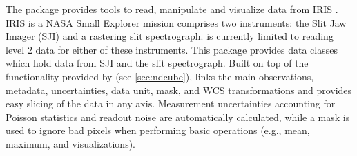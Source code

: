 The  package provides tools to read, manipulate and visualize data from IRIS \citep{DePontieu2014}.
IRIS is a NASA Small Explorer mission comprises two instruments: the Slit Jaw Imager (SJI) and a rastering slit spectrograph.
 is currently limited to reading level 2 data for either of these instruments.
This package provides data classes which hold data from SJI and the slit spectrograph.
Built on top of the functionality provided by  (see \autoref{sec:ndcube}),  links the main observations, metadata, uncertainties, data unit, mask, and WCS transformations and provides easy slicing of the data in any axis.
Measurement uncertainties accounting for Poisson statistics and readout noise are automatically calculated, while a mask is used to ignore bad pixels when performing basic operations (e.g., mean, maximum, and visualizations).
